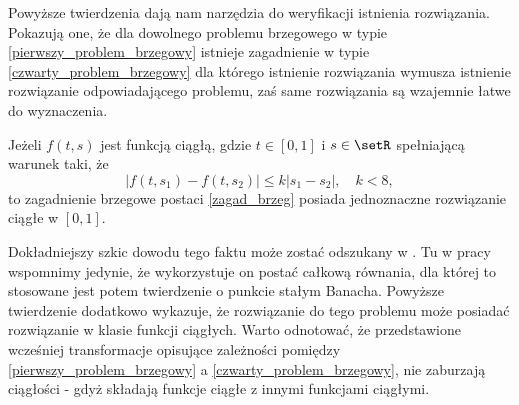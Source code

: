 Powyższe twierdzenia dają nam narzędzia do weryfikacji istnienia rozwiązania. Pokazują one, że dla dowolnego problemu brzegowego w typie \eqref{pierwszy_problem_brzegowy} istnieje zagadnienie w typie \eqref{czwarty_problem_brzegowy} dla którego istnienie rozwiązania wymusza istnienie rozwiązanie odpowiadającego problemu, zaś same rozwiązania są wzajemnie łatwe do wyznaczenia. 

\begin{theorem}
Jeżeli $f(t,s)$ jest funkcją ciągłą, gdzie $t \in [0,1]$ i $s \in \setR$ spełniającą warunek taki, że
$$
|f(t,s_1) - f(t,s_2)| \leq k|s_1 - s_2|, \quad k<8,
$$
to zagadnienie brzegowe postaci \eqref{zagad_brzeg} posiada jednoznaczne rozwiązanie ciągłe w $[0,1]$. 
\end{theorem}
Dokładniejszy szkic dowodu tego faktu może zostać odszukany w \citep{kincaid1991numerical}. Tu w pracy wspomnimy jedynie, że wykorzystuje on postać całkową równania, dla której to stosowane jest potem twierdzenie o punkcie stałym Banacha. Powyższe twierdzenie dodatkowo wykazuje, że rozwiązanie do tego problemu może posiadać rozwiązanie w klasie funkcji ciągłych. Warto odnotować, że przedstawione wcześniej transformacje opisujące zależności pomiędzy \eqref{pierwszy_problem_brzegowy} a \eqref{czwarty_problem_brzegowy}, nie zaburzają ciągłości - gdyż składają funkcje ciągłe z innymi funkcjami ciągłymi. 

